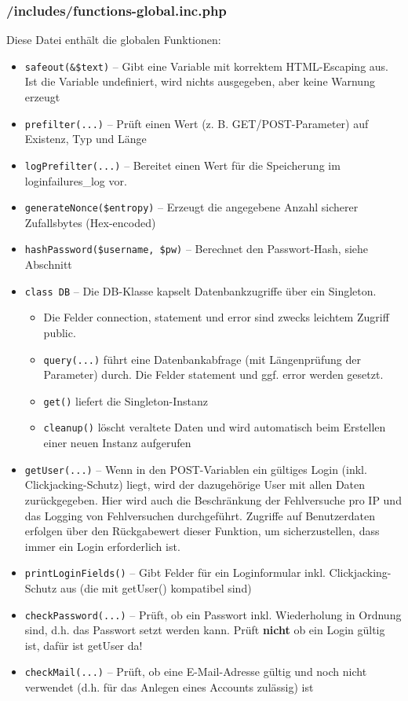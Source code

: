 \subsubsection{/includes/functions-global.inc.php}
Diese Datei enthält die globalen Funktionen:
\begin{itemize}
	\item \texttt{safeout(\&\$text)} -- Gibt eine Variable mit korrektem HTML-Escaping aus. Ist die Variable undefiniert, wird nichts ausgegeben, aber keine Warnung erzeugt
	\item \texttt{prefilter(...)} -- Prüft einen Wert (z. B. GET/POST-Parameter) auf Existenz, Typ und Länge
	\item \texttt{logPrefilter(...)} -- Bereitet einen Wert für die Speicherung im loginfailures\_log vor.
	\item \texttt{generateNonce(\$entropy)} -- Erzeugt die angegebene Anzahl sicherer Zufallsbytes (Hex-encoded)
	\item \texttt{hashPassword(\$username, \$pw)} -- Berechnet den Passwort-Hash, siehe Abschnitt 
	\item \texttt{class DB} -- Die DB-Klasse kapselt Datenbankzugriffe über ein Singleton.
	\begin{itemize}
		\item Die Felder connection, statement und error sind zwecks leichtem Zugriff public.
		\item \texttt{query(...)} führt eine Datenbankabfrage (mit Längenprüfung der Parameter) durch. Die Felder statement und ggf. error werden gesetzt.
		\item \texttt{get()} liefert die Singleton-Instanz
		\item \texttt{cleanup()} löscht veraltete Daten und wird automatisch beim Erstellen einer neuen Instanz aufgerufen
	\end{itemize}
	\item \texttt{getUser(...)} -- Wenn in den POST-Variablen ein gültiges Login (inkl. Clickjacking-Schutz) liegt, wird der dazugehörige User mit allen Daten zurückgegeben.
								Hier wird auch die Beschränkung der Fehlversuche pro IP und das Logging von Fehlversuchen durchgeführt.
								Zugriffe auf Benutzerdaten erfolgen über den Rückgabewert dieser Funktion, um sicherzustellen, dass immer ein Login erforderlich ist.
	\item \texttt{printLoginFields()} -- Gibt Felder für ein Loginformular inkl. Clickjacking-Schutz aus (die mit getUser() kompatibel sind)
	\item \texttt{checkPassword(...)} -- Prüft, ob ein Passwort inkl. Wiederholung in Ordnung sind, d.h. das Passwort setzt werden kann.
										Prüft \textbf{nicht} ob ein Login gültig ist, dafür ist getUser da!
	\item \texttt{checkMail(...)} -- Prüft, ob eine E-Mail-Adresse gültig und noch nicht verwendet (d.h. für das Anlegen eines Accounts zulässig) ist
\end{itemize}

